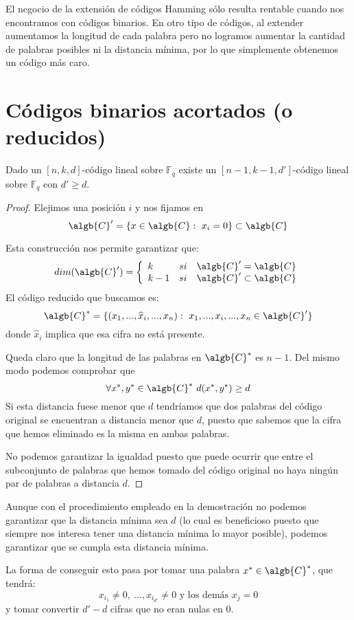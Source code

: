 El negocio de la extensión de códigos Hamming sólo resulta rentable cuando nos encontramos con códigos binarios. En otro tipo de códigos, al extender aumentamos la longitud de cada palabra pero no logramos aumentar la cantidad de palabras posibles ni la distancia mínima, por lo que simplemente obtenemos un código más caro.

\section{Códigos binarios acortados (o reducidos)}
\begin{prop}
Dado un $[n,k,d]$-código lineal sobre $\mathbb{F}_q$ existe un $[n-1,k-1,d']$-código lineal sobre $\mathbb{F}_q$ con $d' \geq d$.
\end{prop}
\begin{proof}
Elejimos una posición $i$ y nos fijamos en
\[\algb{C}'=\{x \in \algb{C} : \ x_i=0\}\subset \algb{C}\]

Esta construcción nos permite garantizar que:
\[dim(\algb{C}') = \left\{ \begin{array}{lll} k & si & \algb{C}'=\algb{C} \\
k-1 & si & \algb{C}' \subset \algb{C}\end{array}\right.\]
El código reducido que buscamos es:
\[\algb{C}^*=\{(x_1,...,\widehat{x}_i,...,x_n): \ x_1,...,x_i,...,x_n \in \algb{C}'\}\]
donde $\widehat{x}_i$ implica que esa cifra no está presente.

Queda claro que la longitud de las palabras en $\algb{C}^*$ es $n-1$. Del mismo modo podemos comprobar que
\[\forall x^*,y^* \in \algb{C}^* \ d(x^*,y^*)\geq d\]
Si esta distancia fuese menor que $d$ tendríamos que dos palabras del código original se encuentran a distancia menor que $d$, puesto que sabemos que la cifra que hemos eliminado es la misma en ambas palabras.

No podemos garantizar la igualdad puesto que puede ocurrir que entre el subconjunto de palabras que hemos tomado del código original no haya ningún par de palabras a distancia $d$.
\end{proof}

Aunque con el procedimiento empleado en la demostración no podemos garantizar que la distancia mínima sea $d$ (lo cual es beneficioso puesto que siempre nos interesa tener una distancia mínima lo mayor posible), podemos garantizar que se cumpla esta distancia mínima.

La forma de conseguir esto pasa por tomar una palabra $x^*\in \algb{C}^*$, que tendrá:
\[x_{i_1}\neq 0, \ ..., x_{i_{d'}}\neq 0 \text{ y los demás } x_j=0\]
y tomar convertir $d'-d$ cifras que no eran nulas en 0.

